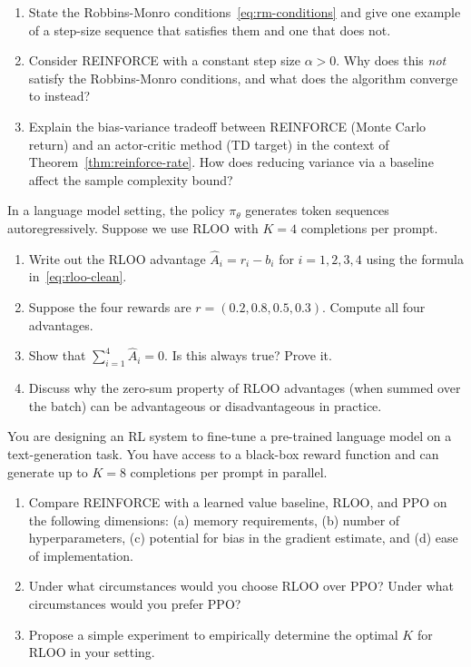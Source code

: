\begin{exercise}
\label{ex:pg-convergence}
\begin{enumerate}
\item State the Robbins-Monro conditions~\eqref{eq:rm-conditions} and give one example of a step-size sequence that satisfies them and one that does not.
\item Consider REINFORCE with a constant step size $\alpha > 0$.  Why does this \emph{not} satisfy the Robbins-Monro conditions, and what does the algorithm converge to instead?
\item Explain the bias-variance tradeoff between REINFORCE (Monte Carlo return) and an actor-critic method (TD target) in the context of Theorem~\ref{thm:reinforce-rate}.  How does reducing variance via a baseline affect the sample complexity bound?
\end{enumerate}
\end{exercise}

\begin{exercise}
\label{ex:pg-lm}
In a language model setting, the policy $\pi_\theta$ generates token sequences autoregressively.  Suppose we use RLOO with $K = 4$ completions per prompt.
\begin{enumerate}
\item Write out the RLOO advantage $\hat A_i = r_i - b_i$ for $i = 1, 2, 3, 4$ using the formula in~\eqref{eq:rloo-clean}.
\item Suppose the four rewards are $r = (0.2, 0.8, 0.5, 0.3)$.  Compute all four advantages.
\item Show that $\sum_{i=1}^4 \hat A_i = 0$.  Is this always true?  Prove it.
\item Discuss why the zero-sum property of RLOO advantages (when summed over the batch) can be advantageous or disadvantageous in practice.
\end{enumerate}
\end{exercise}

\begin{exercise}
\label{ex:pg-comparison-design}
You are designing an RL system to fine-tune a pre-trained language model on a text-generation task.  You have access to a black-box reward function and can generate up to $K = 8$ completions per prompt in parallel.
\begin{enumerate}
\item Compare REINFORCE with a learned value baseline, RLOO, and PPO on the following dimensions: (a) memory requirements, (b) number of hyperparameters, (c) potential for bias in the gradient estimate, and (d) ease of implementation.
\item Under what circumstances would you choose RLOO over PPO?  Under what circumstances would you prefer PPO?
\item Propose a simple experiment to empirically determine the optimal $K$ for RLOO in your setting.
\end{enumerate}
\end{exercise}
